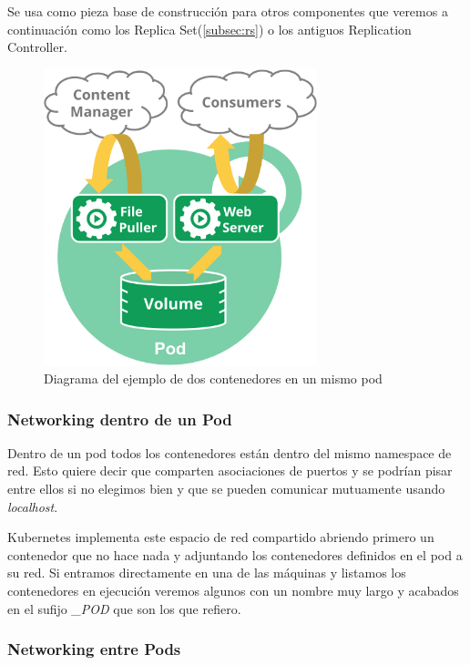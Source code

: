 Se usa como pieza base de construcción para otros componentes que veremos a continuación como los Replica Set(\ref{subsec:rs}) o los antiguos Replication Controller\cite{k8src}.

\begin{figure}[H]
    \centering
    \includegraphics[width=300px]{../images/kubernetes/pod.png}
    \caption{Diagrama del ejemplo de dos contenedores en un mismo pod \protect\cite{k8spods}}
    \label{fig:k8s-pod}
\end{figure}

\subsubsection{Networking dentro de un Pod}
\label{subsubsec:networking-inside}

Dentro de un pod todos los contenedores están dentro del mismo namespace de red. Esto quiere decir que comparten asociaciones de puertos y se podrían pisar entre ellos si no elegimos bien y que se pueden comunicar mutuamente usando \emph{localhost}.

Kubernetes implementa este espacio de red compartido abriendo primero un contenedor que no hace nada y adjuntando los contenedores definidos en el pod a su red. Si entramos directamente en una de las máquinas y listamos los contenedores en ejecución veremos algunos con un nombre muy largo y acabados en el sufijo \emph{\_POD} que son los que refiero.

\subsubsection{Networking entre Pods}
\label{subsubsec:networking-between}

